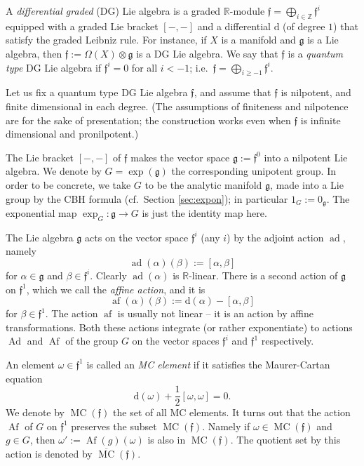 \documentclass[10pt, a4paper]{amsart}
\theoremstyle{definition}
\numberwithin{equation}{section}
\newcommand{\opn}{\operatorname}
\newcommand{\ol}{\overline}
\newcommand{\mfrak}[1]{\mathfrak{#1}}
\newcommand{\mrm}[1]{\mathrm{#1}}
\newcommand{\mbb}[1]{\mathbb{#1}}
\newcommand{\smfrac}[2]{{\textstyle \frac{#1}{#2}}}
\newcommand{\boplus}{\bigoplus\nolimits}
\newcommand{\R}{\mbb{R}}
\newcommand{\Z}{\mbb{Z}}
\newcommand{\g}{\mfrak{g}}
\newcommand{\f}{\mfrak{f}}
\renewcommand{\d}{\mrm{d}}
\newcommand{\lb}{\linebreak}
\begin{document}
A {\em differential graded} (DG) Lie algebra is a graded $\R$-module
$\f = \boplus_{i \in \Z} \f^i$ \lb
equipped with a graded Lie bracket $[-,-]$ and a differential $\d$ (of degree
$1$) that satisfy the graded Leibniz rule. 
For instance, if $X$ is a manifold and $\g$ is a Lie algebra, then 
$\f := \Omega(X) \otimes \g$ is a DG Lie algebra. 
We say that $\f$ is a {\em quantum type} DG Lie algebra if
$\f^i = 0$ for all $i < -1$; i.e.\
$\f = \boplus_{i \geq -1} \f^i$.

Let us fix a quantum type DG Lie algebra $\f$, and assume that $\f$ is
nilpotent, and finite dimensional in each degree. 
(The assumptions of finiteness and nilpotence are for the sake of presentation;
the construction works even when $\f$ is infinite
dimensional  and pronilpotent.)

The Lie bracket $[-,-]$ of $\f$ makes the vector space $\g := \f^0$ into a
nilpotent Lie algebra. We denote by $G = \exp(\g)$ the corresponding unipotent
group. In order to be concrete, we take $G$ to be the analytic manifold $\g$, 
made into a Lie group by the CBH formula (cf.\ Section \ref{sec:expon}); in
particular $1_G := 0_{\g}$. The exponential map $\exp_G : \g \to G$ is just the
identity map here.

The Lie algebra $\g$ acts on the vector space $\f^i$ (any $i$) by the adjoint
action $\opn{ad}$, namely
\[ \opn{ad}(\alpha)(\beta) := [\alpha, \beta] \]
for $\alpha \in \g$ and $\beta \in \f^i$. Clearly $\opn{ad}(\alpha)$ is
$\R$-linear. 
There is a second action of $\g$ on $\f^1$, which we call the {\em affine
action}, and it is
\[ \opn{af}(\alpha)(\beta) := \d(\alpha) - [\alpha, \beta] \]
for $\beta \in \f^1$. The action $\opn{af}$ is usually not linear -- it is an
action by affine transformations. Both these actions integrate (or rather
exponentiate) to actions $\opn{Ad}$ and $\opn{Af}$ of the group $G$ on the
vector spaces $\f^i$ and $\f^1$ respectively. 

An element $\omega \in \f^1$ is called an {\em MC element} if it satisfies the
Maurer-Cartan equation
\[ \d(\omega)+ \smfrac{1}{2}[\omega, \omega] = 0 . \]
We denote by $\opn{MC}(\f)$ the set of all MC elements. 
It turns out that the action $\opn{Af}$ of $G$ on $\f^1$ preserves the subset 
$\opn{MC}(\f)$. Namely if $\omega \in \opn{MC}(\f)$ and $g \in G$, then 
$\omega' := \opn{Af}(g)(\omega)$ is also in $\opn{MC}(\f)$.
The quotient set by this action is denoted by $\ol{\opn{MC}}(\f)$.
\end{document}
